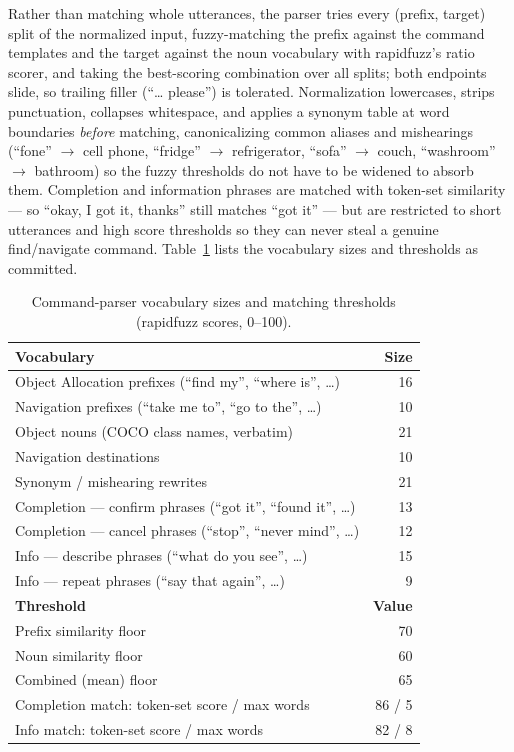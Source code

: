 Rather than matching whole utterances, the parser tries every (prefix, target)
split of the normalized input, fuzzy-matching the prefix against the command
templates and the target against the noun vocabulary with rapidfuzz's ratio
scorer, and taking the best-scoring combination over all splits; both endpoints
slide, so trailing filler (``\ldots{} please'') is tolerated. Normalization
lowercases, strips punctuation, collapses whitespace, and applies a synonym table
at word boundaries \emph{before} matching, canonicalizing common aliases and
mishearings (``fone'' $\to$ cell phone, ``fridge'' $\to$ refrigerator, ``sofa''
$\to$ couch, ``washroom'' $\to$ bathroom) so the fuzzy thresholds do not have to
be widened to absorb them. Completion and information phrases are matched with
token-set similarity --- so ``okay, I got it, thanks'' still matches ``got it''
--- but are restricted to short utterances and high score thresholds so they can
never steal a genuine find/navigate command. Table~\ref{tab:parser} lists the
vocabulary sizes and thresholds as committed.

\begin{table}[!htbp]
\centering
\caption[Parser vocabulary and thresholds]{Command-parser vocabulary sizes and
matching thresholds (rapidfuzz scores, 0--100).}
\label{tab:parser}
\small
\begin{tabular}{p{7.4cm} r}
\toprule
\textbf{Vocabulary} & \textbf{Size} \\
\midrule
Object Allocation prefixes (``find my'', ``where is'', \ldots) & 16 \\
Navigation prefixes (``take me to'', ``go to the'', \ldots) & 10 \\
Object nouns (COCO class names, verbatim) & 21 \\
Navigation destinations & 10 \\
Synonym / mishearing rewrites & 21 \\
Completion --- confirm phrases (``got it'', ``found it'', \ldots) & 13 \\
Completion --- cancel phrases (``stop'', ``never mind'', \ldots) & 12 \\
Info --- describe phrases (``what do you see'', \ldots) & 15 \\
Info --- repeat phrases (``say that again'', \ldots) & 9 \\
\midrule
\textbf{Threshold} & \textbf{Value} \\
\midrule
Prefix similarity floor & 70 \\
Noun similarity floor & 60 \\
Combined (mean) floor & 65 \\
Completion match: token-set score / max words & 86 / 5 \\
Info match: token-set score / max words & 82 / 8 \\
\bottomrule
\end{tabular}
\end{table}


